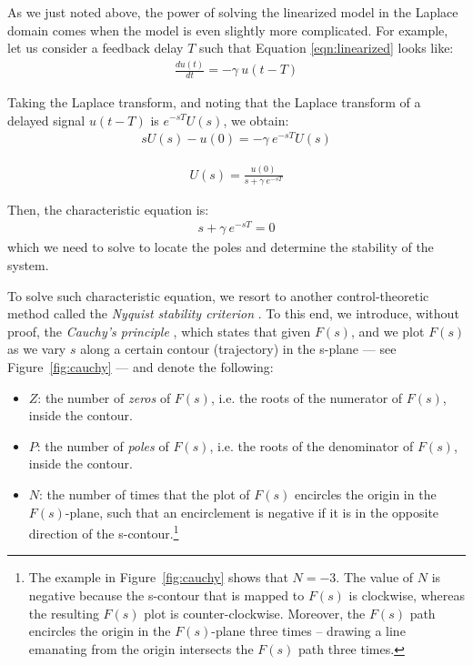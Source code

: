 \documentclass{article}
\begin{document}
As we just noted above, the power of solving the linearized model in the Laplace domain comes when the model is even slightly more complicated. For example, let us consider a feedback delay $T$ such that Equation \ref{eqn:linearized} looks like:
\begin{eqnarray*}
\frac{d u(t)}{dt} = - \gamma\ u(t - T)
\end{eqnarray*}

Taking the Laplace transform, and noting that the Laplace transform of a delayed signal $u(t-T)$ is
$e^{-sT} U(s)$, we obtain:
\begin{eqnarray*}
s U(s) - u(0) = - \gamma\ e^{-sT} U(s)
\end{eqnarray*}

\begin{eqnarray*}
U(s) = \frac{u(0)}{s + \gamma\ e^{-sT}}
\end{eqnarray*}

Then, the characteristic equation is:
\begin{eqnarray}
s + \gamma\ e^{-sT} = 0
\label{eqn:delayed}
\end{eqnarray}
which we need to solve to locate the poles and determine the stability of the system. 

To solve such characteristic equation, we resort to another control-theoretic method called the {\em Nyquist stability criterion} \cite{Ogata:2010}.  To this end, we introduce, without proof,
the {\em Cauchy's principle} \cite{Ogata:2010}, 
which states that given $F(s)$, and we plot $F(s)$ as we vary $s$ along a certain contour (trajectory) in the s-plane --- see Figure~\ref{fig:cauchy} --- and denote the following:
\begin{itemize}
\item $Z$: the number of {\em zeros} of $F(s)$, i.e. the roots of the numerator of $F(s)$, inside the contour.

\item $P$: the number of {\em poles} of $F(s)$, i.e. the roots of the denominator of $F(s)$, inside the contour.

\item $N$: the number of times that the plot of $F(s)$ encircles the origin in the $F(s)$-plane, 
such that an encirclement is negative if it is in the opposite direction of the s-contour.\footnote{
The example in Figure~\ref{fig:cauchy} shows that $N=-3$.
The value of $N$ is negative because the s-contour that is mapped to $F(s)$ is clockwise,
whereas the resulting $F(s)$ plot is counter-clockwise.
Moreover, the $F(s)$ path encircles the origin in the  $F(s)$-plane three times --
drawing a line emanating from  the origin intersects the $F(s)$ path three times.
}
\end{itemize}
\end{document}
